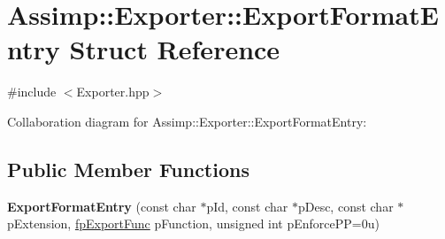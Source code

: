 \hypertarget{struct_assimp_1_1_exporter_1_1_export_format_entry}{\section{Assimp\-:\-:Exporter\-:\-:Export\-Format\-Entry Struct Reference}
\label{struct_assimp_1_1_exporter_1_1_export_format_entry}
}


{\ttfamily \#include $<$Exporter.\-hpp$>$}



Collaboration diagram for Assimp\-:\-:Exporter\-:\-:Export\-Format\-Entry\-:
\subsection*{Public Member Functions}
\begin{DoxyCompactItemize}
\item 
\hypertarget{struct_assimp_1_1_exporter_1_1_export_format_entry_ab89610d7a5b295aa8a22bceae013d76f}{{\bfseries Export\-Format\-Entry} (const char $\ast$p\-Id, const char $\ast$p\-Desc, const char $\ast$p\-Extension, \hyperlink{class_assimp_1_1_exporter_a2e0f2340bca5a7e4f443cbc256928e88}{fp\-Export\-Func} p\-Function, unsigned int p\-Enforce\-P\-P=0u)}\label{struct_assimp_1_1_exporter_1_1_export_format_entry_ab89610d7a5b295aa8a22bceae013d76f}

\end{DoxyCompactItemize}

